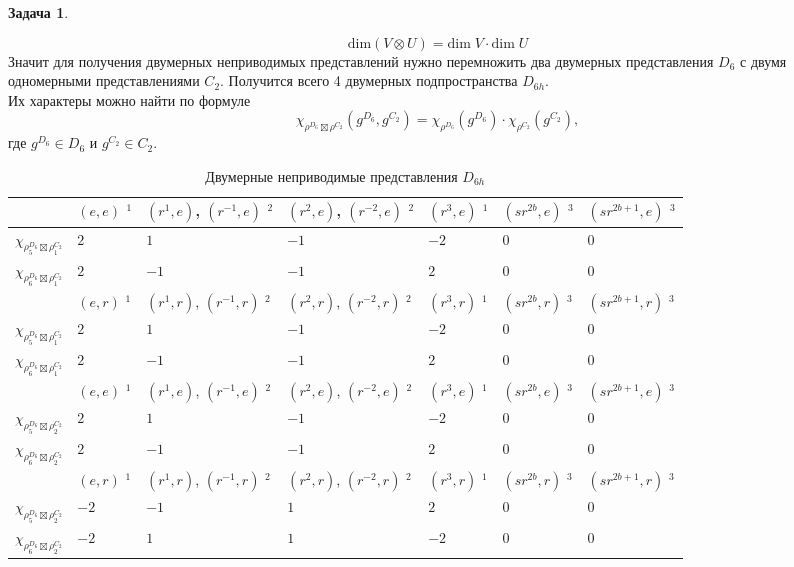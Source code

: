 \documentclass[12pt]{article}
\theoremstyle{definition}
\newtheorem{zad}{Задача}[section]
\begin{document}
\begin{zad}
\begin{itemize}
\begin{equation}
\text{dim}(V\otimes U)=\text{dim}\;V\cdot\text{dim}\;U
\end{equation}
Значит для получения двумерных неприводимых представлений нужно перемножить два двумерных представления $D_6$ с двумя одномерными представлениями $C_2$. Получится всего 4 двумерных подпространства $D_{6h}$.\\
Их характеры можно найти по формуле
\begin{equation}
    \chi_{\rho^{D_6}\boxtimes\rho^{C_2}}(g^{D_6},g^{C_2})=\chi_{\rho^{D_6}}(g^{D_6})\cdot\chi_{\rho^{C_2}}(g^{C_2}),
\end{equation}
где $g^{D_6}\in D_6$ и $g^{C_2}\in C_2$.
\begin{table}[h!]
\centering
\begin{tabular}{|l|l|l|l|l|l|l|}
\hline
 & $(e,e)$ $^1$ & $(r^1,e)$, $(r^{-1},e)$ $^2$ & $(r^2,e)$, $(r^{-2},e)$ $^2$ & $(r^3,e)$ $^1$ & $(sr^{2b},e)$ $^3$ & $(sr^{2b+1},e)$ $^3$ \\ \hline
$\chi_{\rho_5^{D_6}\boxtimes\rho_1^{C_2}}$ & $2$ & $1$ & $-1$ & $-2$ & $0$ & $0$ \\ \hline
$\chi_{\rho_6^{D_6}\boxtimes\rho_1^{C_2}}$ & $2$ & $-1$ & $-1$ & $2$ & $0$ & $0$ \\ \hline
 & $(e,r)$ $^1$ & $(r^1,r)$, $(r^{-1},r)$ $^2$ & $(r^2,r)$, $(r^{-2},r)$ $^2$ & $(r^3,r)$ $^1$ & $(sr^{2b},r)$ $^3$ & $(sr^{2b+1},r)$ $^3$ \\ \hline
$\chi_{\rho_5^{D_6}\boxtimes\rho_1^{C_2}}$ & $2$ & $1$ & $-1$ & $-2$ & $0$ & $0$ \\ \hline
$\chi_{\rho_6^{D_6}\boxtimes\rho_1^{C_2}}$ & $2$ & $-1$ & $-1$ & $2$ & $0$ & $0$ \\ \hline
 & $(e,e)$ $^1$ & $(r^1,e)$, $(r^{-1},e)$ $^2$ & $(r^2,e)$, $(r^{-2},e)$ $^2$ & $(r^3,e)$ $^1$ & $(sr^{2b},e)$ $^3$ & $(sr^{2b+1},e)$ $^3$ \\ \hline
$\chi_{\rho_5^{D_6}\boxtimes\rho_2^{C_2}}$ & $2$ & $1$ & $-1$ & $-2$ & $0$ & $0$ \\ \hline
$\chi_{\rho_6^{D_6}\boxtimes\rho_2^{C_2}}$ & $2$ & $-1$ & $-1$ & $2$ & $0$ & $0$ \\ \hline
 & $(e,r)$ $^1$ & $(r^1,r)$, $(r^{-1},r)$ $^2$ & $(r^2,r)$, $(r^{-2},r)$ $^2$ & $(r^3,r)$ $^1$ & $(sr^{2b},r)$ $^3$ & $(sr^{2b+1},r)$ $^3$ \\ \hline
$\chi_{\rho_5^{D_6}\boxtimes\rho_2^{C_2}}$ & $-2$ & $-1$ & $1$ & $2$ & $0$ & $0$ \\ \hline
$\chi_{\rho_6^{D_6}\boxtimes\rho_2^{C_2}}$ & $-2$ & $1$ & $1$ & $-2$ & $0$ & $0$ \\ \hline
\end{tabular}
\caption{Двумерные неприводимые представления $D_{6h}$}
\end{table}
\end{itemize}
\end{zad}
\end{document}
